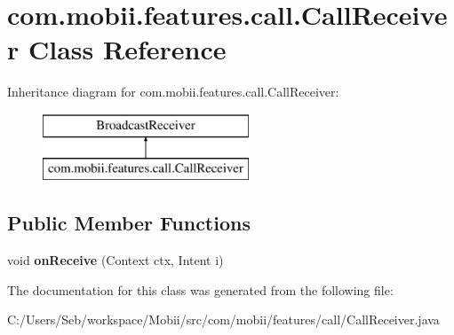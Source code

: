 \hypertarget{classcom_1_1mobii_1_1features_1_1call_1_1_call_receiver}{\section{com.\-mobii.\-features.\-call.\-Call\-Receiver Class Reference}
\label{classcom_1_1mobii_1_1features_1_1call_1_1_call_receiver}
}
Inheritance diagram for com.\-mobii.\-features.\-call.\-Call\-Receiver\-:\begin{figure}[H]
\begin{center}
\leavevmode
\includegraphics[height=2.000000cm]{classcom_1_1mobii_1_1features_1_1call_1_1_call_receiver}
\end{center}
\end{figure}
\subsection*{Public Member Functions}
\begin{DoxyCompactItemize}
\item 
\hypertarget{classcom_1_1mobii_1_1features_1_1call_1_1_call_receiver_a694566004c607eb412f42d32c5489ed2}{void {\bfseries on\-Receive} (Context ctx, Intent i)}\label{classcom_1_1mobii_1_1features_1_1call_1_1_call_receiver_a694566004c607eb412f42d32c5489ed2}

\end{DoxyCompactItemize}


The documentation for this class was generated from the following file\-:\begin{DoxyCompactItemize}
\item 
C\-:/\-Users/\-Seb/workspace/\-Mobii/src/com/mobii/features/call/Call\-Receiver.\-java\end{DoxyCompactItemize}
